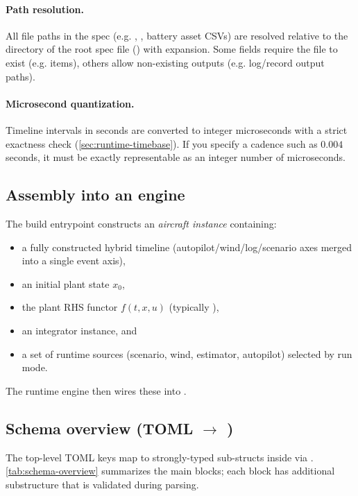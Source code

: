 \paragraph{Path resolution.}
All file paths in the spec (e.g. , , battery asset CSVs) are resolved relative to the directory of the root spec file () with \code{\textasciitilde} expansion. Some fields require the file to exist (e.g.  items), others allow non-existing outputs (e.g. log/record output paths).

\paragraph{Microsecond quantization.}
Timeline intervals in seconds are converted to integer microseconds with a strict exactness check (\cref{sec:runtime-timebase}). If you specify a cadence such as \(0.004\) seconds, it must be exactly representable as an integer number of microseconds.

\subsection{Assembly into an engine}

The build entrypoint constructs an \emph{aircraft instance} containing:
\begin{itemize}[leftmargin=*,itemsep=2pt]
  \item a fully constructed hybrid timeline (autopilot/wind/log/scenario axes merged into a single event axis),
  \item an initial plant state \(x_0\),
  \item the plant RHS functor \(f(t,x,u)\) (typically ),
  \item an integrator instance, and
  \item a set of runtime sources (scenario, wind, estimator, autopilot) selected by run mode.
\end{itemize}
The runtime engine then wires these into .

\subsection{Schema overview (TOML \texorpdfstring{$\to$}{->} \texorpdfstring{}{AircraftSpec})}
\label{sec:config-schema}

The top-level TOML keys map to strongly-typed sub-structs inside  via . \cref{tab:schema-overview} summarizes the main blocks; each block has additional substructure that is validated during parsing.


